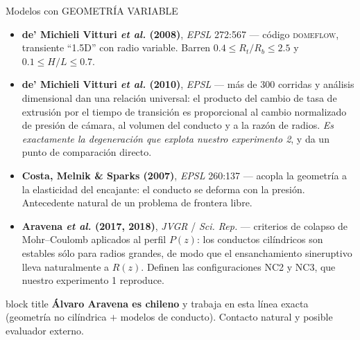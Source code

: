 \documentclass[aspectratio=169,10pt,t]{beamer}
\newcommand{\mensaje}[1]{%
  \vfill
  \begin{beamercolorbox}[wd=\linewidth,sep=0.4em,rounded=true]{block title}
  \footnotesize #1
  \end{beamercolorbox}}
\begin{document}
\begin{frame}{Modelos con GEOMETRÍA VARIABLE}
\footnotesize
\begin{itemize}
  \item \textbf{de' Michieli Vitturi \emph{et al.} (2008)}, \emph{EPSL}
    272:567 — código \textsc{domeflow}, transiente ``1.5D'' con radio variable.
    Barren $0.4\le R_t/R_b\le2.5$ y $0.1\le H/L\le0.7$.
  \item \textbf{de' Michieli Vitturi \emph{et al.} (2010)}, \emph{EPSL} — más de
    300 corridas y análisis dimensional dan una relación universal: el producto
    del cambio de tasa de extrusión por el tiempo de transición es proporcional
    al cambio normalizado de presión de cámara, \alert{al volumen del conducto} y
    a la razón de radios. \emph{Es exactamente la degeneración que explota
    nuestro experimento 2}, y da un punto de comparación directo.
  \item \textbf{Costa, Melnik \& Sparks (2007)}, \emph{EPSL} 260:137 — acopla la
    geometría a la elasticidad del encajante: el conducto se deforma con la
    presión. Antecedente natural de un problema de frontera libre.
  \item \textbf{Aravena \emph{et al.} (2017, 2018)}, \emph{JVGR} / \emph{Sci.
    Rep.} — criterios de colapso de Mohr–Coulomb aplicados al perfil $P(z)$:
    \alert{los conductos cilíndricos son estables sólo para radios grandes}, de
    modo que el ensanchamiento sineruptivo lleva naturalmente a $R(z)$. Definen
    las configuraciones NC2 y NC3, que nuestro experimento 1 reproduce.
\end{itemize}

\mensaje{\textbf{Álvaro Aravena es chileno} y trabaja en esta línea exacta
(geometría no cilíndrica $+$ modelos de conducto). Contacto natural y posible
evaluador externo.}
\end{frame}
\end{document}
